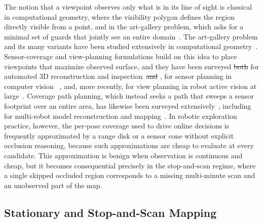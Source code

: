 \documentclass[sensors,article,submit,pdftex,moreauthors]{Definitions/mdpi}
\providecommand{\DIFadd}[1]{{\protect\color{blue} \sf #1}} %
\providecommand{\DIFdel}[1]{{\protect\color{red}\protect\scriptsize\protect\sout{#1}}} %
\providecommand{\DIFaddbegin}{} %
\providecommand{\DIFaddend}{} %
\providecommand{\DIFdelbegin}{} %
\providecommand{\DIFdelend}{} %
\begin{document}
The notion that a viewpoint observes only what is in its line of sight is
classical in computational geometry, where the visibility polygon defines the
region directly visible from a point, and in the art-gallery problem, which asks
for a minimal set of guards that jointly see an entire
domain~\cite{gonzalez2002}. The art-gallery problem and its many
variants have been studied extensively in computational
geometry~\cite{orourke1987,urrutia2000}. Sensor-coverage and view-planning
formulations build on this idea to place viewpoints that maximize observed
surface, and they have been surveyed \DIFdelbegin \DIFdel{both }\DIFdelend for automated 3D reconstruction and
inspection~\cite{scott2003}\DIFdelbegin \DIFdel{and }\DIFdelend \DIFaddbegin \DIFadd{, }\DIFaddend for sensor planning in computer
vision~\cite{tarabanis1995}\DIFaddbegin \DIFadd{, and, more recently, for view planning in robot
active vision at large~\cite{zeng2020}}\DIFaddend . Coverage path planning, which instead seeks a path
that sweeps a sensor footprint over an entire area, has likewise been surveyed
extensively~\cite{choset2001,galceran2013}, including for multi-robot model
reconstruction and mapping~\cite{almadhoun2019}. In robotic exploration
practice, however, the per-pose coverage used to drive online decisions is
frequently approximated by a range disk or a sensor cone without explicit
occlusion reasoning, because such approximations are cheap to evaluate at every
candidate. This approximation is
benign when observation is continuous and cheap, but it becomes consequential
precisely in the stop-and-scan regime, where a single skipped occluded region
corresponds to a missing multi-minute scan and an unobserved part of the map.

\subsection{Stationary and Stop-and-Scan Mapping}
\end{document}
